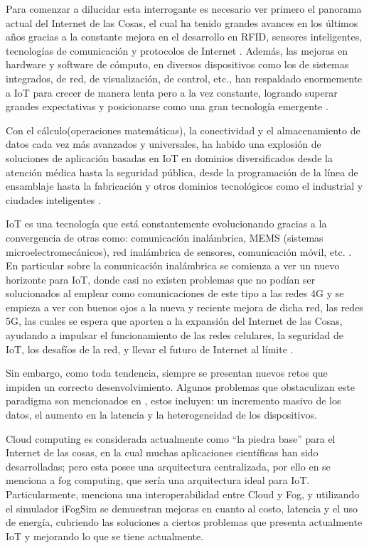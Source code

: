 \vskip 0.3cm
Para comenzar a dilucidar esta interrogante es necesario ver primero el panorama actual del Internet de las Cosas, el cual ha tenido grandes avances en los últimos años gracias a la constante mejora en el desarrollo en RFID, sensores inteligentes, tecnologías de comunicación y protocolos de Internet \citep{alfuqaha2015,borgia2014}. Además, las mejoras en hardware y software de cómputo, en diversos dispositivos como los de sistemas integrados, de red, de visualización, de control, etc., han respaldado enormemente a IoT para crecer de manera lenta pero a la vez constante, logrando superar grandes expectativas y posicionarse como una gran tecnología emergente \citep{vyas2017}.\par
\vskip 0.3cm
Con el cálculo(operaciones matemáticas), la conectividad y el almacenamiento de datos cada vez más avanzados y universales, ha habido una explosión de soluciones de aplicación basadas en IoT en dominios diversificados desde la atención médica hasta la seguridad pública, desde la programación de la línea de ensamblaje hasta la fabricación y otros dominios tecnológicos como el industrial y ciudades inteligentes \citep{borgia2014,vyas2017}.\par
\vskip 0.3cm
IoT es una tecnología que está constantemente evolucionando gracias a la convergencia de otras como: comunicación inalámbrica, MEMS (sistemas microelectromecánicos), red inalámbrica de sensores, comunicación móvil, etc. \citep{vyas2017}. En particular sobre la comunicación inalámbrica se comienza a ver un nuevo horizonte para IoT, donde casi no existen problemas que no podían ser solucionados al emplear como comunicaciones de este tipo a las redes 4G y se empieza a ver con buenos ojos a la nueva y reciente mejora de dicha red, las redes 5G, las cuales se espera que aporten a la expansión del Internet de las Cosas, ayudando a impulsar el funcionamiento de las redes celulares, la seguridad de IoT, los desafíos de la red, y llevar el futuro de Internet al límite \citep{li2018}.\par
\vskip 0.3cm
Sin embargo, como toda tendencia, siempre se presentan nuevos retos que impiden un correcto desenvolvimiento. Algunos problemas que obstaculizan este paradigma son mencionados en \citep{borgia2014,ibrahim2015,mahumd2018}, estos incluyen: un incremento masivo de los datos, el aumento en la latencia y la heterogeneidad de los dispositivos.\par
\vskip 0.3cm
Cloud computing \citep{ibrahim2015} es considerada actualmente como “la piedra base” para el Internet de las cosas, en la cual muchas aplicaciones científicas han sido desarrolladas; pero esta posee una arquitectura centralizada, por ello en \citep{mahumd2018,patel2018,yi2015} se menciona a fog computing, que sería una arquitectura ideal para IoT. Particularmente, \citep{mahumd2018} menciona una interoperabilidad entre Cloud y Fog, y utilizando el simulador iFogSim se demuestran mejoras en cuanto al costo, latencia y el uso de energía, cubriendo las soluciones a ciertos problemas que presenta actualmente IoT y mejorando lo que se tiene actualmente.\par
